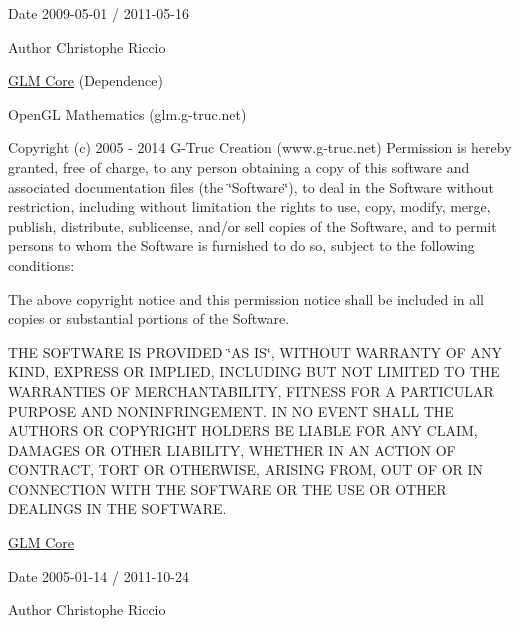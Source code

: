 \begin{DoxyDate}{Date}
2009-\/05-\/01 / 2011-\/05-\/16 
\end{DoxyDate}
\begin{DoxyAuthor}{Author}
Christophe Riccio
\end{DoxyAuthor}
\hyperlink{group__core}{G\+LM Core} (Dependence)

Open\+GL Mathematics (glm.\+g-\/truc.\+net)

Copyright (c) 2005 -\/ 2014 G-\/\+Truc Creation (www.\+g-\/truc.\+net) Permission is hereby granted, free of charge, to any person obtaining a copy of this software and associated documentation files (the \char`\"{}\+Software\char`\"{}), to deal in the Software without restriction, including without limitation the rights to use, copy, modify, merge, publish, distribute, sublicense, and/or sell copies of the Software, and to permit persons to whom the Software is furnished to do so, subject to the following conditions\+:

The above copyright notice and this permission notice shall be included in all copies or substantial portions of the Software.

T\+HE S\+O\+F\+T\+W\+A\+RE IS P\+R\+O\+V\+I\+D\+ED \char`\"{}\+A\+S I\+S\char`\"{}, W\+I\+T\+H\+O\+UT W\+A\+R\+R\+A\+N\+TY OF A\+NY K\+I\+ND, E\+X\+P\+R\+E\+SS OR I\+M\+P\+L\+I\+ED, I\+N\+C\+L\+U\+D\+I\+NG B\+UT N\+OT L\+I\+M\+I\+T\+ED TO T\+HE W\+A\+R\+R\+A\+N\+T\+I\+ES OF M\+E\+R\+C\+H\+A\+N\+T\+A\+B\+I\+L\+I\+TY, F\+I\+T\+N\+E\+SS F\+OR A P\+A\+R\+T\+I\+C\+U\+L\+AR P\+U\+R\+P\+O\+SE A\+ND N\+O\+N\+I\+N\+F\+R\+I\+N\+G\+E\+M\+E\+NT. IN NO E\+V\+E\+NT S\+H\+A\+LL T\+HE A\+U\+T\+H\+O\+RS OR C\+O\+P\+Y\+R\+I\+G\+HT H\+O\+L\+D\+E\+RS BE L\+I\+A\+B\+LE F\+OR A\+NY C\+L\+A\+IM, D\+A\+M\+A\+G\+ES OR O\+T\+H\+ER L\+I\+A\+B\+I\+L\+I\+TY, W\+H\+E\+T\+H\+ER IN AN A\+C\+T\+I\+ON OF C\+O\+N\+T\+R\+A\+CT, T\+O\+RT OR O\+T\+H\+E\+R\+W\+I\+SE, A\+R\+I\+S\+I\+NG F\+R\+OM, O\+UT OF OR IN C\+O\+N\+N\+E\+C\+T\+I\+ON W\+I\+TH T\+HE S\+O\+F\+T\+W\+A\+RE OR T\+HE U\+SE OR O\+T\+H\+ER D\+E\+A\+L\+I\+N\+GS IN T\+HE S\+O\+F\+T\+W\+A\+RE.

\hyperlink{group__core}{G\+LM Core}

\begin{DoxyDate}{Date}
2005-\/01-\/14 / 2011-\/10-\/24 
\end{DoxyDate}
\begin{DoxyAuthor}{Author}
Christophe Riccio 
\end{DoxyAuthor}
